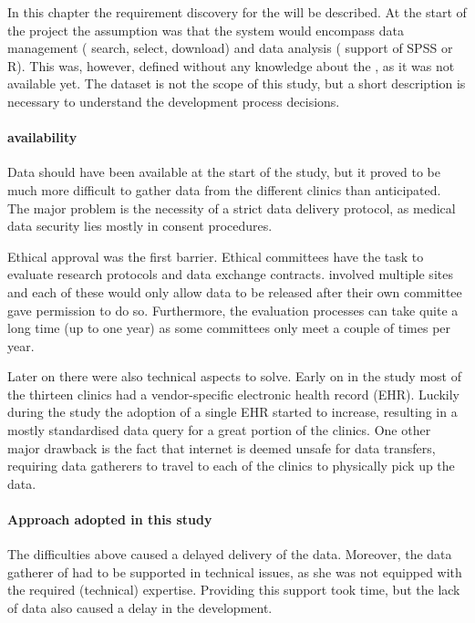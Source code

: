 In this chapter the requirement discovery for the \ivfsystem{} will be described.
At the start of the project the assumption was that the system would encompass data management (\eg{} search, select, download) and data analysis (\eg{} support of SPSS or R).
This was, however, defined without any knowledge about the \projectdata{}, as it was not available yet.
The dataset is not the scope of this study, but a short description is necessary to understand the development process decisions.

\paragraph{\projectdata{} availability}
Data should have been available at the start of the study, but it proved to be much more difficult to gather data from the different clinics than anticipated.
The major problem is the necessity of a strict data delivery protocol, as medical data security lies mostly in consent procedures.

Ethical approval was the first barrier.
Ethical committees have the task to evaluate research protocols and data exchange contracts.
\project{} involved multiple sites and each of these would only allow data to be released after their own committee gave permission to do so.
Furthermore, the evaluation processes can take quite a long time (up to one year) as some committees only meet a couple of times per year.

Later on there were also technical aspects to solve.
Early on in the study most of the thirteen clinics had a vendor-specific electronic health record (EHR).
Luckily during the study the adoption of a single EHR started to increase, resulting in a mostly standardised data query for a great portion of the clinics.
One other major drawback is the fact that internet is deemed unsafe for data transfers, requiring data gatherers to travel to each of the clinics to physically pick up the data.

\paragraph{Approach adopted in this study}
The difficulties above caused a delayed delivery of the data.
Moreover, the data gatherer of \project{} had to be supported in technical issues, as she was not equipped with the required (technical) expertise. 
Providing this support took time, but the lack of data also caused a delay in the \ivfsystem{} development.

